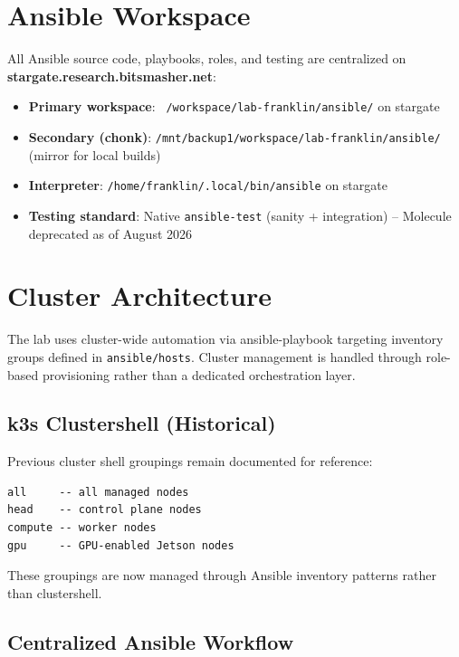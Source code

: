 
\section{Ansible Workspace}

All Ansible source code, playbooks, roles, and testing are centralized on \textbf{stargate.research.bitsmasher.net}:

\begin{itemize}
    \item \textbf{Primary workspace}: \texttt{~/workspace/lab-franklin/ansible/} on stargate
    
    \item \textbf{Secondary (chonk)}: \texttt{/mnt/backup1/workspace/lab-franklin/ansible/} (mirror for local builds)
    
    \item \textbf{Interpreter}: \texttt{/home/franklin/.local/bin/ansible} on stargate
    
    \item \textbf{Testing standard}: Native \texttt{ansible-test} (sanity + integration) -- Molecule deprecated as of August 2026
\end{itemize}

\section{Cluster Architecture}

The lab uses cluster-wide automation via ansible-playbook targeting inventory groups defined in \texttt{ansible/hosts}. Cluster management is handled through role-based provisioning rather than a dedicated orchestration layer.

\subsection{k3s Clustershell (Historical)}

Previous cluster shell groupings remain documented for reference:
\begin{verbatim}
all     -- all managed nodes
head    -- control plane nodes
compute -- worker nodes
gpu     -- GPU-enabled Jetson nodes
    \end{verbatim}

These groupings are now managed through Ansible inventory patterns rather than clustershell.

\subsection{Centralized Ansible Workflow}

